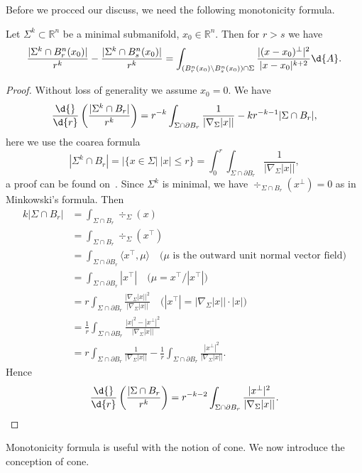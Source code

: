 Before we procced our discuss, we need the following monotonicity formula.
\begin{thm}
    Let $\Sigma^k\subset\mathbb{R}^n$ be a minimal submanifold, $x_0\in\mathbb{R}^n$.
    Then for $r>s$ we have
    \[\frac{|\Sigma^k\cap B^n_r(x_0)|}{r^k}-\frac{|\Sigma^k\cap B^n_s(x_0)|}{r^k}=\int_{(B^n_r(x_0)\backslash B^n_s(x_0))\cap\Sigma}\frac{|(x-x_0)^\perp|^2}{|x-x_0|^{k+2}}\d{A}.\]
\end{thm}
\begin{proof}
    Without loss of generality we assume $x_0=0$.
    We have
    \[\frac{\d{}}{\d{r}}\left(\frac{|\Sigma^k\cap B_r|}{r^k}\right)=r^{-k}\int_{\Sigma\cap\partial B_r}\frac{1}{|\nabla_\Sigma|x||}-kr^{-k-1}|\Sigma\cap B_r|,\]
    here we use the coarea formula
    \[|\Sigma^k\cap B_r|=|\{x\in\Sigma|\ |x|\leq r\}=\int_0^r\int_{\Sigma\cap\partial B_r}\frac{1}{|\nabla_\Sigma|x||},\]
    a proof can be found on~\cite{Mei}.
    Since $\Sigma^k$ is minimal, we have $\div\nolimits_{\Sigma\cap B_r}(x^\perp)=0$ as in Minkowski's formula.
    Then
    \begin{align*}
        k|\Sigma\cap B_r|&=\int_{\Sigma\cap B_r}\div\nolimits_{\Sigma}(x)\\
        &=\int_{\Sigma\cap B_r}\div\nolimits_{\Sigma}(x^\top)\\
        &=\int_{\Sigma\cap\partial B_r}\langle x^\top,\mu\rangle\quad\text{($\mu$ is the outward unit normal vector field)}\\
        &=\int_{\Sigma\cap\partial B_r}|x^\top|\quad\text{($\mu=x^\top/|x^\top|$)}\\
        &=r\int_{\Sigma\cap\partial B_r}\frac{|\nabla_\Sigma|x||^2}{|\nabla_\Sigma|x||}\quad\text{($|x^\top|=|\nabla_\Sigma|x||\cdot|x|$)}\\
        &=\frac{1}{r}\int_{\Sigma\cap\partial B_r}\frac{|x|^2-|x^\perp|^2}{|\nabla_\Sigma|x||}\\
        &=r\int_{\Sigma\cap\partial B_r}\frac{1}{|\nabla_\Sigma|x||}-\frac{1}{r}\int_{\Sigma\cap\partial B_r}\frac{|x^\perp|^2}{|\nabla_\Sigma|x||}.
    \end{align*}
    Hence
    \[\frac{\d{}}{\d{r}}\left(\frac{|\Sigma\cap B_r}{r^k}\right)=r^{-k-2}\int_{\Sigma\cap\partial B_r}\frac{|x^\perp|^2}{|\nabla_\Sigma|x||}.\qedhere\]
\end{proof}

Monotonicity formula is useful with the notion of cone.
We now introduce the conception of cone.

